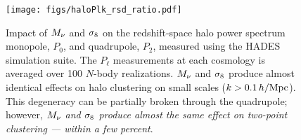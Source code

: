 \begin{figure}
\begin{center}
\texttt{[image: figs/haloPlk\_rsd\_ratio.pdf]}
    \caption{Impact of $M_\nu$ and $\sigma_8$ on the redshift-space halo power 
    spectrum monopole, $P_0$, and quadrupole, $P_2$, measured using the 
    HADES simulation suite. The $P_\ell$ measurements at each cosmology is
    averaged over 100 $N$-body realizations. $M_\nu$ and $\sigma_8$ produce 
    almost identical effects on halo clustering on small scales 
    ($k > 0.1\,h/\mathrm{Mpc}$). This degeneracy can be partially broken through 
    the quadrupole; however, {\em $M_\nu$ and $\sigma_8$ produce almost 
    the same effect on two-point clustering --- within a few percent}.
    }
\label{fig:plk}
\end{center}
\end{figure}


